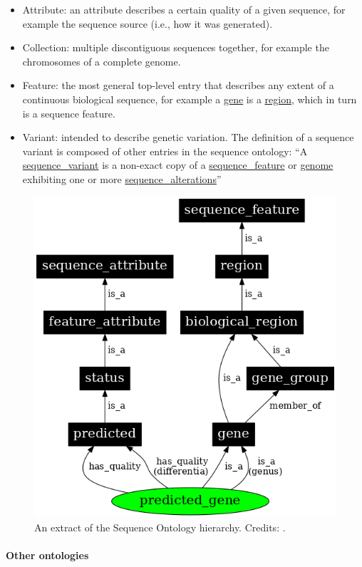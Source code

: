 \begin{itemize}
\item Attribute: an attribute describes a certain quality of a given sequence, for example the sequence source (i.e., how it was generated).
\item Collection: multiple discontiguous sequences together, for example the chromosomes of a complete genome.
\item Feature: the most general top-level entry that describes any extent of a continuous biological sequence, for example a \href{http://sequenceontology.org/browser/current\_release/term/SO:0000704}{gene} is a \href{http://sequenceontology.org/browser/current\_release/term/SO:0000001}{region}, which in turn is a sequence feature.
\item Variant: intended to describe genetic variation. The definition of a sequence variant is composed of other entries in the sequence ontology: ``A \href{http://sequenceontology.org/browser/current\_release/term/SO:0001060}{sequence\_variant} is a non-exact copy of a \href{http://sequenceontology.org/browser/current\_release/term/SO:0000110}{sequence\_feature} or \href{http://sequenceontology.org/browser/current\_release/term/SO:0001026}{genome} exhibiting one or more \href{http://sequenceontology.org/browser/current\_release/term/SO:0001059}{sequence\_alterations}''
\end{itemize}

\begin{figure}[!htbp]
\centering
\includegraphics[width=0.4\linewidth]{files/sequence_ontology-3ebb78a944729d0afd7391447a463a9f.png}
\caption[]{An extract of the Sequence Ontology hierarchy.
Credits: \cite{so_2005}.}
\label{so}
\end{figure}

\paragraph{Other ontologies}\label{chapter1_other_ontologies}

